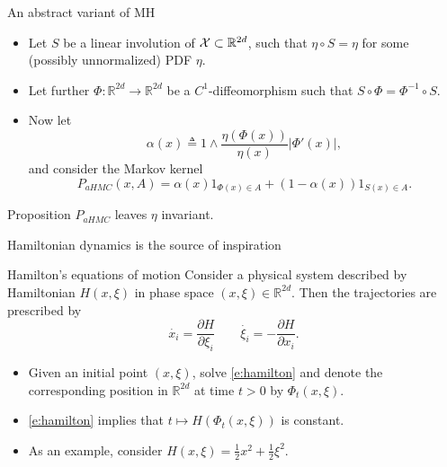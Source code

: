 \documentclass[10pt]{beamer}
\begin{document}
\begin{frame}{An abstract variant of MH}
\begin{itemize}
  \item Let $S$ be a linear involution of $\mathcal{X}\subset\mathbb{R}^{2d}$, such that $\eta\circ S = \eta$ for some (possibly unnormalized) PDF $\eta$.
  \vspace{2.5cm}
  \item Let further $\Phi:\mathbb{R}^{2d}\rightarrow \mathbb{R}^{2d}$ be a $C^1$-diffeomorphism such that $S\circ \Phi = \Phi^{-1}\circ S$.
  \item Now let 
\begin{equation}
    \label{e:acceptance_probability_abstract_HMC}
    \alpha(x) \triangleq 1\wedge \frac{\eta(\Phi(x))}{\eta(x)} \vert\Phi'(x)\vert,
\end{equation}
and consider the Markov kernel
$$
P_{aHMC}(x,A) = \alpha(x) 1_{\Phi(x)\in A} + (1-\alpha(x))1_{S(x)\in A}.
$$
\end{itemize}
\begin{block}{Proposition}
$P_{aHMC}$ leaves $\eta$ invariant.
\end{block}
\end{frame}

\begin{frame}{Hamiltonian dynamics is the source of inspiration}
\begin{block}{Hamilton's equations of motion}
Consider a physical system described by Hamiltonian $H(x,\xi)$ in phase space $(x,\xi)\in \mathbb{R}^{2d}$. Then the trajectories are prescribed by
\begin{equation}
  \label{e:hamilton}
  \dot{x_i} = \frac{\partial H}{\partial \xi_i} \qquad \dot{\xi_i} = -\frac{\partial H}{\partial x_i}.
\end{equation}
\end{block}
\begin{itemize}
  \item Given an initial point $(x,\xi)$, solve \eqref{e:hamilton} and denote the corresponding position in $\mathbb{R}^{2d}$ at time $t>0$ by $\Phi_t(x,\xi)$.
  \item \eqref{e:hamilton} implies that $t\mapsto H(\Phi_t(x,\xi))$ is constant.
  \item As an example, consider $H(x,\xi) = \frac12 x^2 + \frac12 \xi^2.$
\end{itemize}
\blank
\end{frame}
\end{document}
